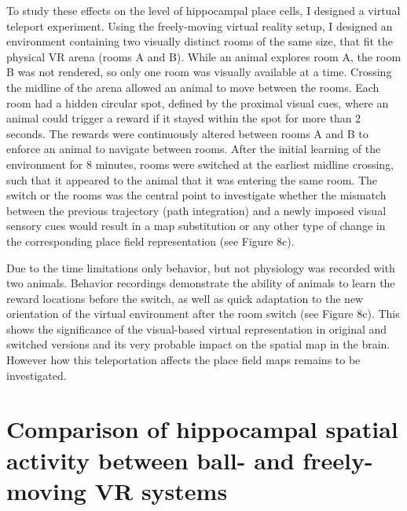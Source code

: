 To study these effects on the level of hippocampal place cells, I designed a virtual teleport experiment. Using the freely-moving virtual reality setup, I designed an environment containing two visually distinct rooms of the same size, that fit the physical VR arena (rooms A and B). While an animal explores room A, the room B was not rendered, so only one room was visually available at a time. Crossing the midline of the arena allowed an animal to move between the rooms. Each room had a hidden circular spot, defined by the proximal visual cues, where an animal could trigger a reward if it stayed within the spot for more than 2 seconds. The rewards were continuously altered between rooms A and B to enforce an animal to navigate between rooms. After the initial learning of the environment for 8 minutes, rooms were switched at the earliest midline crossing, such that it appeared to the animal that it was entering the same room. The switch or the rooms was the central point to investigate whether the mismatch between the previous trajectory (path integration) and a newly imposed visual sensory cues would result in a map substitution or any other type of change in the corresponding place field representation (see Figure 8c).

Due to the time limitations only behavior, but not physiology was recorded with two animals. Behavior recordings demonstrate the ability of animals to learn the reward locations before the switch, as well as quick adaptation to the new orientation of the virtual environment after the room switch (see Figure 8c). This shows the significance of the visual-based virtual representation in original and switched versions and its very probable impact on the spatial map in the brain. However how this teleportation affects the place field maps remains to be investigated.


\section[Comparison of ball- and freely-moving VR]{Comparison of hippocampal spatial activity between ball- and freely-moving VR systems%
              }
\label{sec:comparison_ball_vr}

